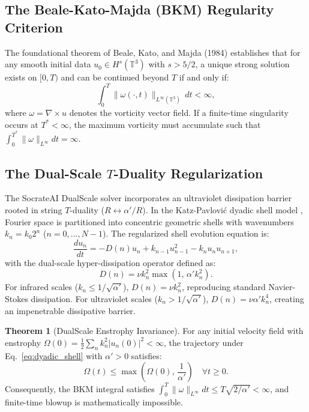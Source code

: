 \documentclass[10pt,a4paper,twocolumn]{article}
\theoremstyle{definition}
\newtheorem{theorem}{Theorem}[section]
\begin{document}
\subsection{The Beale-Kato-Majda (BKM) Regularity Criterion}
The foundational theorem of Beale, Kato, and Majda (1984) \cite{bkm1984} establishes that for any smooth initial data $u_0 \in H^s(\mathbb{T}^3)$ with $s > 5/2$, a unique strong solution exists on $[0, T)$ and can be continued beyond $T$ if and only if:
\begin{equation}
\int_0^T \|\omega(\cdot, t)\|_{L^\infty(\mathbb{T}^3)} \, dt < \infty,
\label{eq:bkm}
\end{equation}
where $\omega = \nabla \times u$ denotes the vorticity vector field. If a finite-time singularity occurs at $T^* < \infty$, the maximum vorticity must accumulate such that $\int_0^{T^*} \|\omega\|_{L^\infty} dt = \infty$.

\subsection{The Dual-Scale $T$-Duality Regularization}
The SocrateAI DualScale solver incorporates an ultraviolet dissipation barrier rooted in string $T$-duality ($R \leftrightarrow \alpha'/R$). In the Katz-Pavlovi\'c dyadic shell model \cite{katz2002}, Fourier space is partitioned into concentric geometric shells with wavenumbers $k_n = k_0 2^n$ ($n = 0, \dots, N-1$). The regularized shell evolution equation is:
\begin{equation}
\frac{d u_n}{dt} = - D(n) u_n + k_{n-1} u_{n-1}^2 - k_n u_n u_{n+1},
\label{eq:dyadic_shell}
\end{equation}
with the dual-scale hyper-dissipation operator defined as:
\begin{equation}
D(n) = \nu k_n^2 \max\left(1, \, \alpha' k_n^2\right).
\label{eq:dualscale_disp}
\end{equation}
For infrared scales ($k_n \le 1/\sqrt{\alpha'}$), $D(n) = \nu k_n^2$, reproducing standard Navier-Stokes dissipation. For ultraviolet scales ($k_n > 1/\sqrt{\alpha'}$), $D(n) = \nu \alpha' k_n^4$, creating an impenetrable dissipative barrier.

\begin{theorem}[DualScale Enstrophy Invariance]
For any initial velocity field with enstrophy $\Omega(0) = \frac{1}{2}\sum_n k_n^2 |u_n(0)|^2 < \infty$, the trajectory under Eq.~\eqref{eq:dyadic_shell} with $\alpha' > 0$ satisfies:
\begin{equation}
\Omega(t) \le \max\left(\Omega(0), \, \frac{1}{\alpha'}\right) \quad \forall t \ge 0.
\end{equation}
Consequently, the BKM integral satisfies $\int_0^T \|\omega\|_{L^\infty} dt \le T \sqrt{2/\alpha'} < \infty$, and finite-time blowup is mathematically impossible.
\end{theorem}
\end{document}
